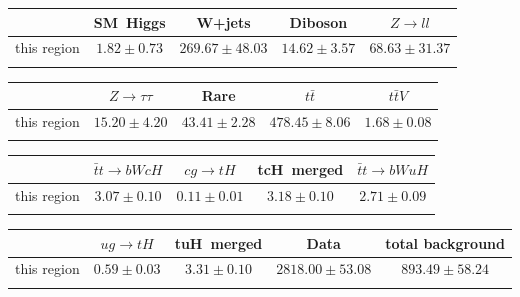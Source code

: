 \centering
\begin{tabular}{ccccc} \toprule\toprule
 & SM~Higgs & W+jets & Diboson & $Z\to ll$\\\midrule
this region & $1.82\pm0.73$ & $269.67\pm48.03$ & $14.62\pm3.57$ & $68.63\pm31.37$\\
\bottomrule\bottomrule\\
\end{tabular}
\begin{tabular}{ccccc} \toprule\toprule
 & $Z\to \tau\tau$ & Rare & $t\bar{t}$ & $t\bar{t}V$\\\midrule
this region & $15.20\pm4.20$ & $43.41\pm2.28$ & $478.45\pm8.06$ & $1.68\pm0.08$\\
\bottomrule\bottomrule\\
\end{tabular}
\begin{tabular}{ccccc} \toprule\toprule
 & $\bar{t}t\to bWcH$ & $cg\to tH$ & tcH~merged & $\bar{t}t\to bWuH$\\\midrule
this region & $3.07\pm0.10$ & $0.11\pm0.01$ & $3.18\pm0.10$ & $2.71\pm0.09$\\
\bottomrule\bottomrule\\
\end{tabular}
\begin{tabular}{ccccc} \toprule\toprule
 & $ug\to tH$ & tuH~merged & Data & total background\\\midrule
this region & $0.59\pm0.03$ & $3.31\pm0.10$ & $2818.00\pm53.08$ & $893.49\pm58.24$\\
\bottomrule\bottomrule\\
\end{tabular}
